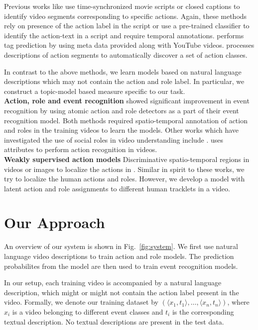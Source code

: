 \documentclass[10pt,twocolumn,letterpaper]{article}
\begin{document}
Previous works like \cite{Laptev_CVPR08, Marszalek_CVPR09, Cour_ECCV08, Everingham_BMVC06} use 
time-synchronized movie scripts or closed captions to identify video segments corresponding to specific actions. 
Again, these methods rely on presence of the action label in the script or use a pre-trained classifier \cite{Laptev_CVPR08} 
to identify the action-text in a script and require temporal annotations. 
\cite{Yang_CVPR11} performs tag prediction by using meta data provided along with YouTube videos. 
\cite{Motwani_ECAI12} processes descriptions of action segments to automatically discover a set of action classes.

In contrast to the above methods, we learn models based on natural language
descriptions which may not contain the action and role label. In particular, we
construct a topic-model based measure specific to our task.
\\
\noindent \textbf{Action, role and event recognition} \cite{Izadinia_ECCV12,
Lan_CVPR12} showed significant improvement in event recognition by using atomic
action and role detectors as a part of their event recognition model. Both
methods required spatio-temporal annotation of action and roles in the
training videos to learn the models. Other works which have investigated the
use of social roles in video understanding include \cite{Wang_ECCV10, Fathi_CVPR12}. \cite{Liu_CVPR11} uses attributes to perform action
recognition in videos. 
\\
\noindent \textbf{Weakly supervised action models} 
Discriminative spatio-temporal regions in videos or images to localize the actions in \cite{Satkin_ECCV10, Raptis_ECCV12, Singh_ECCV12}.
Similar in spirit to these works, we try to localize the human actions and roles. 
However, we develop a model with latent action and role assignments to different human tracklets in a video.

\section{Our Approach} \label{sec:model_formualation}

An overview of our system is shown in Fig.~\ref{fig:system}. We first use
natural language video descriptions to train action and role models.  The prediction probabilites
from the model are then used to train event recognition models.

In our setup, each training video is accompanied by a natural language
description, which might or might not contain the action label
present in the video.
Formally, we denote our training dataset by
$\left(\langle x_1, t_1 \rangle, \dots , \langle x_n, t_n\rangle \right)$,
where $x_i$ is a video belonging to different event classes and
$t_i$ is the corresponding textual description. 
No textual descriptions are present in the test data.
\end{document}
